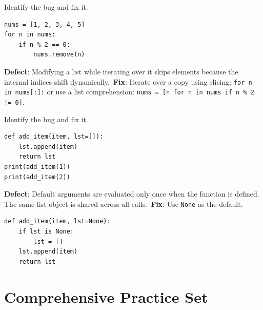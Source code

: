 \begin{debuggingbox}
Identify the bug and fix it.
\begin{lstlisting}[language=Python3]
nums = [1, 2, 3, 4, 5]
for n in nums:
    if n % 2 == 0:
        nums.remove(n)
\end{lstlisting}
\textbf{Defect}: Modifying a list while iterating over it skips elements because the internal indices shift dynamically.\
\textbf{Fix}: Iterate over a copy using slicing: \texttt{for n in nums[:]:} or use a list comprehension: \texttt{nums = [n for n in nums if n \% 2 != 0]}.
\end{debuggingbox}

\begin{debuggingbox}
Identify the bug and fix it.
\begin{lstlisting}[language=Python3]
def add_item(item, lst=[]):
    lst.append(item)
    return lst
print(add_item(1))
print(add_item(2))
\end{lstlisting}
\textbf{Defect}: Default arguments are evaluated only once when the function is defined. The same list object is shared across all calls.\
\textbf{Fix}: Use \texttt{None} as the default.
\begin{lstlisting}[language=Python3]
def add_item(item, lst=None):
    if lst is None:
        lst = []
    lst.append(item)
    return lst
\end{lstlisting}
\end{debuggingbox}

\section{Comprehensive Practice Set}

